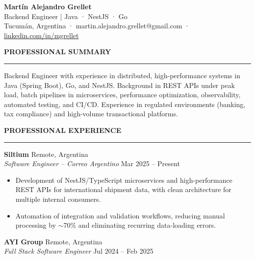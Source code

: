 \documentclass[11pt]{article}
\newcommand{\jobsep}{\vspace{8pt}}
\begin{document}
\begin{center}
    {\Large \textbf{Martín Alejandro Grellet}}\\[2pt]
    {\normalsize Backend Engineer | Java · NestJS · Go}\\[2pt]
    Tucumán, Argentina · martin.alejandro.grellet@gmail.com ·
    \href{https://www.linkedin.com/in/mgrellet}{linkedin.com/in/mgrellet}
\end{center}

\vspace{20pt}

{\large \textbf{PROFESSIONAL SUMMARY}}\\[3pt]
\hrule
\vspace{3pt}

Backend Engineer with experience in distributed, high-performance systems in Java (Spring Boot), Go, and NestJS. Background in REST APIs under peak load, batch pipelines in microservices, performance optimization, observability, automated testing, and CI/CD. Experience in regulated environments (banking, tax compliance) and high-volume transactional platforms.

\vspace{20pt}

{\large \textbf{PROFESSIONAL EXPERIENCE}}\\[3pt]
\hrule
\vspace{3pt}

\textbf{Siltium} \hfill Remote, Argentina\\
\textit{Software Engineer -- Correo Argentino} \hfill Mar 2025 -- Present

\begin{itemize}
    \item Development of NestJS/TypeScript microservices and high-performance REST APIs for international shipment data, with clean architecture for multiple internal consumers.
    \item Automation of integration and validation workflows, reducing manual processing by $\sim$70\% and eliminating recurring data-loading errors.
\end{itemize}

\jobsep

\textbf{AYI Group} \hfill Remote, Argentina\\
\textit{Full Stack Software Engineer} \hfill Jul 2024 -- Feb 2025
\end{document}
